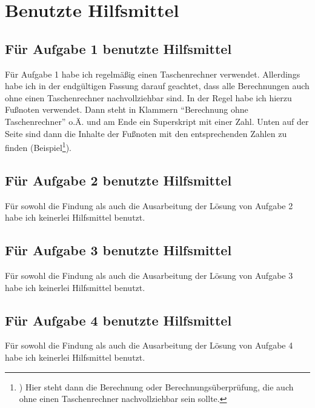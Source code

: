 
\section*{Benutzte Hilfsmittel}

\subsection*{Für Aufgabe 1 benutzte Hilfsmittel}

Für Aufgabe 1 habe ich regelmäßig einen Taschenrechner verwendet. Allerdings habe ich in der endgültigen Fassung 
darauf geachtet, dass alle Berechnungen auch ohne einen Taschenrechner nachvollziehbar sind. In der Regel habe 
ich hierzu Fußnoten verwendet. Dann steht in Klammern "`Berechnung ohne Taschenrechner"' o.Ä. und am Ende ein 
Superskript mit einer Zahl. Unten auf der Seite sind dann die Inhalte der Fußnoten mit  den entsprechenden Zahlen 
zu finden (Beispiel\footnote{) Hier steht dann die Berechnung oder Berechnungsüberprüfung, die auch ohne einen 
Taschenrechner nachvollziehbar sein sollte.}).


\subsection*{Für Aufgabe 2 benutzte Hilfsmittel}

Für sowohl die Findung als auch die Ausarbeitung der Lösung von Aufgabe 2 habe ich keinerlei Hilfsmittel benutzt.

\subsection*{Für Aufgabe 3 benutzte Hilfsmittel}

Für sowohl die Findung als auch die Ausarbeitung der Lösung von Aufgabe 3 habe ich keinerlei Hilfsmittel benutzt.

\subsection*{Für Aufgabe 4 benutzte Hilfsmittel}

Für sowohl die Findung als auch die Ausarbeitung der Lösung von Aufgabe 4 habe ich keinerlei Hilfsmittel benutzt.